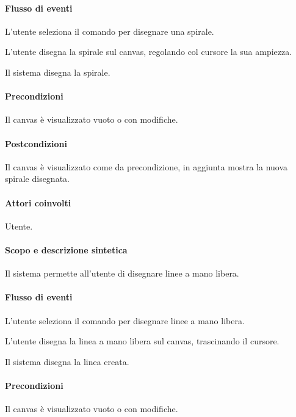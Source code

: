 \paragraph{Flusso di eventi}
\begin{elenconumerato}[\textbf{}]{\subsubsecindent}
\item L'utente seleziona il comando per disegnare una spirale.
\item L'utente disegna la spirale sul canvas, regolando col cursore la sua ampiezza.
\item Il sistema disegna la spirale.
\end{elenconumerato}
\paragraph{Precondizioni} Il canvas \`e visualizzato vuoto o con modifiche.
\paragraph{Postcondizioni} Il canvas \`e visualizzato come da precondizione, in aggiunta mostra la nuova spirale disegnata.

\paragraph{Attori coinvolti} Utente.
\paragraph{Scopo e descrizione sintetica} 
Il sistema permette all'utente di disegnare linee a mano libera.
\paragraph{Flusso di eventi}
\begin{elenconumerato}[\textbf{}]{\subsubsecindent}
\item L'utente seleziona il comando per disegnare linee a mano libera.
\item L'utente disegna la linea a mano libera sul canvas, trascinando il cursore.
\item Il sistema disegna la linea creata.
\end{elenconumerato}
\paragraph{Precondizioni} Il canvas \`e visualizzato vuoto o con modifiche.
